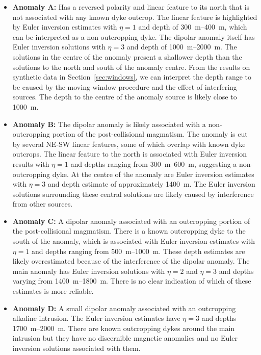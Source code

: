\begin{itemize}
\item \textbf{Anomaly A:} Has a reversed polarity and linear feature to its north that is not associated with any known dyke outcrop.
The linear feature is highlighted by Euler inversion estimates with $\eta=1$ and depth of \qtyrange{300}{400}{\m}, which can be interpreted as a non-outcropping dyke.
The dipolar anomaly itself has Euler inversion solutions with $\eta=3$ and depth of \qtyrange{1000}{2000}{\m}.
The solutions in the centre of the anomaly present a shallower depth than the solutions to the north and south of the anomaly centre.
From the results on synthetic data in Section~\ref{sec:windows}, we can interpret the depth range to be caused by the moving window procedure and the effect of interfering sources.
The depth to the centre of the anomaly source is likely close to \qty{1000}{\m}.

\item \textbf{Anomaly B:} The dipolar anomaly is likely associated with a non-outcropping portion of the post-collisional magmatism.
The anomaly is cut by several NE-SW linear features, some of which overlap with known dyke outcrops.
The linear feature to the north is associated with Euler inversion results with $\eta=1$ and depths ranging from \qtyrange{300}{600}{\m}, suggesting a non-outcropping dyke.
At the centre of the anomaly are Euler inversion estimates with $\eta=3$ and depth estimate of approximately \qty{1400}{\m}.
The Euler inversion solutions surrounding these central solutions are likely caused by interference from other sources.

\item \textbf{Anomaly C:} A dipolar anomaly associated with an outcropping portion of the post-collisional magmatism.
There is a known outcropping dyke to the south of the anomaly, which is associated with Euler inversion estimates with $\eta=1$ and depths ranging from \qtyrange{500}{1000}{\m}.
These depth estimates are likely overestimated because of the interference of the dipolar anomaly.
The main anomaly has Euler inversion solutions with $\eta=2$ and $\eta=3$ and depths varying from
\qtyrange{1400}{1800}{\m}.
There is no clear indication of which of these estimates is more reliable.

\item \textbf{Anomaly D:} A small dipolar anomaly associated with an outcropping alkaline intrusion.
The Euler inversion estimates have $\eta=3$ and depths \qtyrange{1700}{2000}{\m}.
There are known outcropping dykes around the main intrusion but they have no discernible magnetic anomalies and no Euler inversion solutions associated with them.
\end{itemize}

